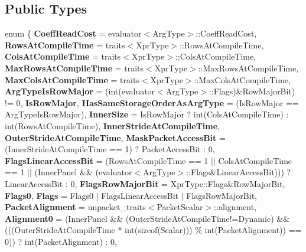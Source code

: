 \subsection*{Public Types}
\begin{DoxyCompactItemize}
\item 
\mbox{\label{struct_eigen_1_1internal_1_1evaluator_3_01_block_3_01_arg_type_00_01_block_rows_00_01_block_cols_00_01_inner_panel_01_4_01_4_a3b62f699cd8bac44b5fba7bf903dee2f}} 
enum \{ \newline
{\bfseries Coeff\+Read\+Cost} = evaluator$<$Arg\+Type$>$\+:\+:Coeff\+Read\+Cost, 
{\bfseries Rows\+At\+Compile\+Time} = traits$<$Xpr\+Type$>$\+:\+:Rows\+At\+Compile\+Time, 
{\bfseries Cols\+At\+Compile\+Time} = traits$<$Xpr\+Type$>$\+:\+:Cols\+At\+Compile\+Time, 
{\bfseries Max\+Rows\+At\+Compile\+Time} = traits$<$Xpr\+Type$>$\+:\+:Max\+Rows\+At\+Compile\+Time, 
\newline
{\bfseries Max\+Cols\+At\+Compile\+Time} = traits$<$Xpr\+Type$>$\+:\+:Max\+Cols\+At\+Compile\+Time, 
{\bfseries Arg\+Type\+Is\+Row\+Major} = (int(evaluator$<$Arg\+Type$>$\+:\+:Flags)\&Row\+Major\+Bit) != 0, 
{\bfseries Is\+Row\+Major}, 
{\bfseries Has\+Same\+Storage\+Order\+As\+Arg\+Type} = (Is\+Row\+Major == Arg\+Type\+Is\+Row\+Major), 
\newline
{\bfseries Inner\+Size} = Is\+Row\+Major ? int(Cols\+At\+Compile\+Time) \+: int(Rows\+At\+Compile\+Time), 
{\bfseries Inner\+Stride\+At\+Compile\+Time}, 
{\bfseries Outer\+Stride\+At\+Compile\+Time}, 
{\bfseries Mask\+Packet\+Access\+Bit} = (Inner\+Stride\+At\+Compile\+Time == 1) ? Packet\+Access\+Bit \+: 0, 
\newline
{\bfseries Flags\+Linear\+Access\+Bit} = (Rows\+At\+Compile\+Time == 1 $\vert$$\vert$ Cols\+At\+Compile\+Time == 1 $\vert$$\vert$ (Inner\+Panel \&\& (evaluator$<$Arg\+Type$>$\+:\+:Flags\&Linear\+Access\+Bit))) ? Linear\+Access\+Bit \+: 0, 
{\bfseries Flags\+Row\+Major\+Bit} = Xpr\+Type\+:\+:Flags\&Row\+Major\+Bit, 
{\bfseries Flags0}, 
{\bfseries Flags} = Flags0 $\vert$ Flags\+Linear\+Access\+Bit $\vert$ Flags\+Row\+Major\+Bit, 
\newline
{\bfseries Packet\+Alignment} = unpacket\+\_\+traits$<$Packet\+Scalar$>$\+:\+:alignment, 
{\bfseries Alignment0} = (Inner\+Panel \&\& (Outer\+Stride\+At\+Compile\+Time!=Dynamic) \&\& (((Outer\+Stride\+At\+Compile\+Time $\ast$ int(sizeof(Scalar))) \% int(Packet\+Alignment)) == 0)) ? int(Packet\+Alignment) \+: 0, 

\end{DoxyCompactItemize}
